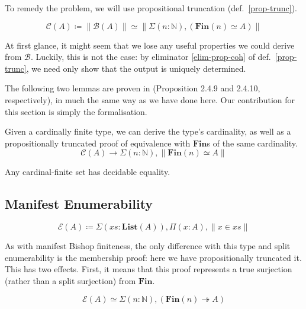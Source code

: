 
To remedy the problem, we will use propositional truncation
(def.~\ref{prop-trunc}).
\begin{romdefinition}
  \begin{equation}
    \mathcal{C}(A) \coloneqq \lVert \mathcal{B}(A) \rVert \simeq \lVert \Sigma(n : \mathbb{N}) , (\mathbf{Fin}(n) \simeq A) \rVert
  \end{equation}
\end{romdefinition}
At first glance, it might seem that we lose any useful properties we could
derive from \(\mathcal{B}\).
Luckily, this is not the case: by eliminator \ref{elim-prop-coh} of
def.~\ref{prop-trunc}, we need only show that the output is uniquely determined.

The following two lemmas are proven in
\cite{yorgeyCombinatorialSpeciesLabelled2014} (Proposition 2.4.9 and 2.4.10,
respectively), in much the same way as we have done here.
Our contribution for this section is simply the formalisation.
\begin{romlemma}
  Given a cardinally finite type, we can derive the type's cardinality, as well
  as a propositionally truncated proof of equivalence with \(\textbf{Fin}\)s of
  the same cardinality.
  \begin{equation}
    \mathcal{C}(A) \rightarrow \Sigma {(n : \mathbb{N})} , \lVert \textbf{Fin}(n) \simeq A \rVert
  \end{equation}
\end{romlemma}
\begin{romlemma} \label{cardinal-finite-discrete}
  Any cardinal-finite set has decidable equality.
\end{romlemma}
\subsection{Manifest Enumerability}
\begin{romdefinition}
  \begin{equation}
    \mathcal{E}(A) \coloneqq \Sigma {(\mathit{xs} : \mathbf{List}(A))} , \Pi {(x : A)} , \lVert x \in \mathit{xs} \rVert
  \end{equation}
\end{romdefinition}
As with manifest Bishop finiteness, the only difference with this type and split
enumerability is the membership proof: here we have propositionally truncated
it.
This has two effects.
First, it means that this proof represents a true surjection (rather than a
split surjection) from \(\mathbf{Fin}\).
\begin{romlemma}
  \begin{equation}
    \mathcal{E}(A) \simeq \Sigma(n : \mathbb{N}) , (\mathbf{Fin}(n) \twoheadrightarrow A)
  \end{equation}
\end{romlemma}

